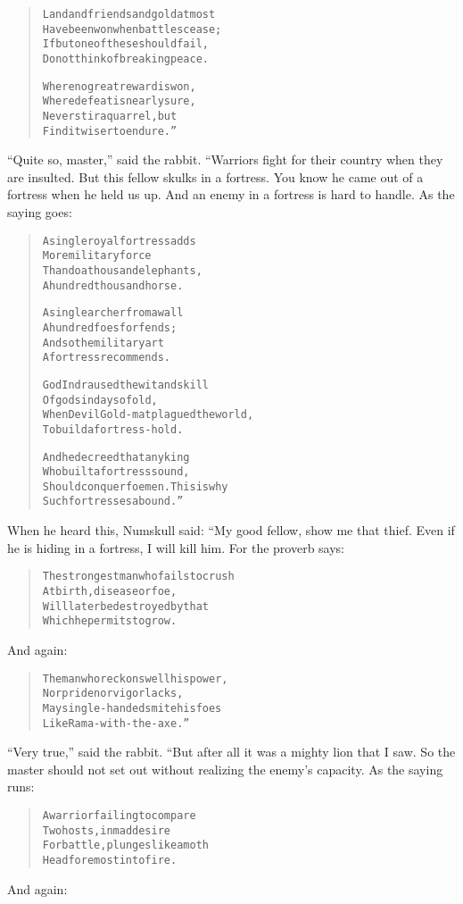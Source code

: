 \documentclass[article, twoside, 14pt]{memoir}
\renewenvironment{verbatim}{%
\begin{quote}%
\vskip -10pt%
\begin{alltt}\normalfont\large}{\end{alltt}%
\end{quote}%
\vskip -10pt
} %
\begin{document}
\begin{verbatim}
Land and friends and gold at most
    Have been won when battles cease;
If but one of these should fail,
    Do not think of breaking peace.

Where no great reward is won,
    Where defeat is nearly sure,
Never stir a quarrel, but
    Find it wiser to endure.”
\end{verbatim}
``Quite so, master,'' said the rabbit. “Warriors fight for their
country when they are insulted. But this fellow skulks in a
fortress. You know he came out of a fortress when he held us up.
And an enemy in a fortress is hard to handle. As the saying goes:

\begin{verbatim}
A single royal fortress adds
    More military force
Than do a thousand elephants,
    A hundred thousand horse.

A single archer from a wall
    A hundred foes forfends;
And so the military art
    A fortress recommends.

God Indra used the wit and skill
    Of gods in days of old,
When Devil Gold-mat plagued the world,
    To build a fortress-hold.

And he decreed that any king
    Who built a fortress sound,
Should conquer foemen. This is why
    Such fortresses abound.”
\end{verbatim}
When he heard this, Numskull said: “My good fellow, show me that
thief. Even if he is hiding in a fortress, I will kill him. For the
proverb says:

\begin{verbatim}
The strongest man who fails to crush
    At birth, disease or foe,
Will later be destroyed by that
    Which he permits to grow.
\end{verbatim}
And again:

\begin{verbatim}
The man who reckons well his power,
    Nor pride nor vigor lacks,
May single-handed smite his foes
    Like Rama-with-the-axe.”
\end{verbatim}
``Very true,'' said the rabbit. “But after all it was a mighty lion
that I saw. So the master should not set out without realizing the
enemy's capacity. As the saying runs:

\begin{verbatim}
A warrior failing to compare
    Two hosts, in mad desire
For battle, plunges like a moth
    Headforemost into fire.
\end{verbatim}
And again:
\end{document}
